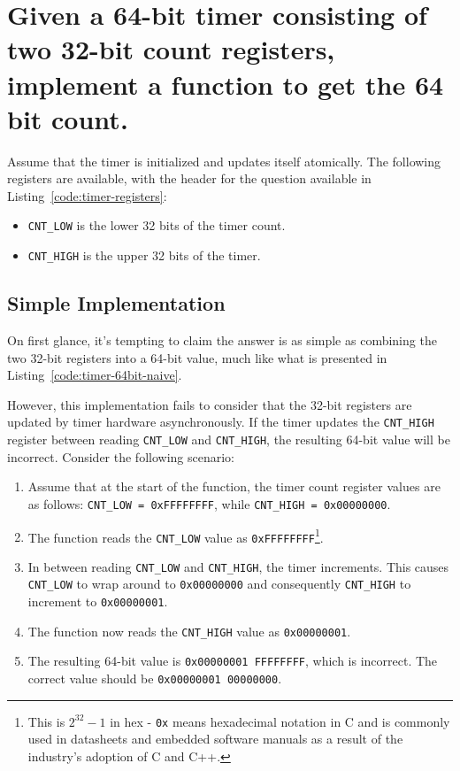 \documentclass[main.tex]{subfiles}
\begin{document}
\section{Given a 64-bit timer consisting of two 32-bit count registers, implement a function to get the 64 bit count.}
Assume that the timer is initialized and updates itself atomically. The following registers are available, with the header for the question available in Listing~\ref{code:timer-registers}:
\begin{itemize}
    \item \texttt{CNT\_LOW} is the lower 32 bits of the timer count.
    \item \texttt{CNT\_HIGH} is the upper 32 bits of the timer.
\end{itemize}



\spoilerline

\subsection{Simple Implementation}
On first glance, it's tempting to claim the answer is as simple as combining the two 32-bit registers into a 64-bit value, much like what is presented in Listing~\ref{code:timer-64bit-naive}.



\noindent However, this implementation fails to consider that the 32-bit registers are updated by timer hardware asynchronously. If the timer updates the \texttt{CNT\_HIGH} register between reading \texttt{CNT\_LOW} and \texttt{CNT\_HIGH}, the resulting 64-bit value will be incorrect. Consider the following scenario:
\begin{enumerate}
    \item Assume that at the start of the function, the timer count register values are as follows: \texttt{CNT\_LOW = 0xFFFFFFFF}, while \texttt{CNT\_HIGH = 0x00000000}.
    \item The function reads the \texttt{CNT\_LOW} value as \texttt{0xFFFFFFFF}\footnote{This is $2^{32}-1$ in hex - \texttt{0x} means hexadecimal notation in C and is commonly used in datasheets and embedded software manuals as a result of the industry's adoption of C and C++.}.
    \item In between reading \texttt{CNT\_LOW} and \texttt{CNT\_HIGH}, the timer increments. This causes \texttt{CNT\_LOW} to wrap around to \texttt{0x00000000} and consequently \texttt{CNT\_HIGH} to increment to \texttt{0x00000001}.
    \item The function now reads the \texttt{CNT\_HIGH} value as \texttt{0x00000001}.
    \item The resulting 64-bit value is \texttt{0x00000001 FFFFFFFF}, which is incorrect. The correct value should be \texttt{0x00000001 00000000}.
\end{enumerate}
\end{document}
